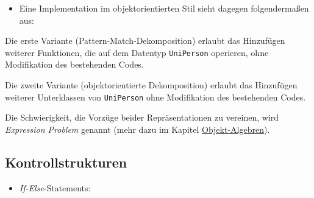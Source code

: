 \documentclass[]{article}
\newenvironment{Shaded}{}{}
\newcommand{\FunctionTok}[1]{\textcolor[rgb]{0.02,0.16,0.49}{#1}}
\newcommand{\KeywordTok}[1]{\textcolor[rgb]{0.00,0.44,0.13}{\textbf{#1}}}
\newcommand{\NormalTok}[1]{#1}
\newcommand{\StringTok}[1]{\textcolor[rgb]{0.25,0.44,0.63}{#1}}
\providecommand{\tightlist}{%
  \setlength{\itemsep}{0pt}\setlength{\parskip}{0pt}}
\begin{document}
\begin{itemize}
\tightlist
\item
  Eine Implementation im objektorientierten Stil sieht dagegen
  folgendermaßen aus:
\end{itemize}

\begin{Shaded}
\end{Shaded}

Die erste Variante (Pattern-Match-Dekomposition) erlaubt das Hinzufügen
weiterer Funktionen, die auf dem Datentyp \texttt{UniPerson} operieren,
ohne Modifikation des bestehenden Codes.

Die zweite Variante (objektorientierte Dekomposition) erlaubt das
Hinzufügen weiterer Unterklassen von \texttt{UniPerson} ohne
Modifikation des bestehenden Codes.

Die Schwierigkeit, die Vorzüge beider Repräsentationen zu vereinen, wird
\emph{Expression Problem} genannt (mehr dazu im Kapitel
\hyperlink{expression-problem}{Objekt-Algebren}).

\hypertarget{kontrollstrukturen}{%
\subsection{Kontrollstrukturen}\label{kontrollstrukturen}}

\begin{itemize}
\tightlist
\item
  \emph{If-Else}-Statements:
\end{itemize}
\end{document}
